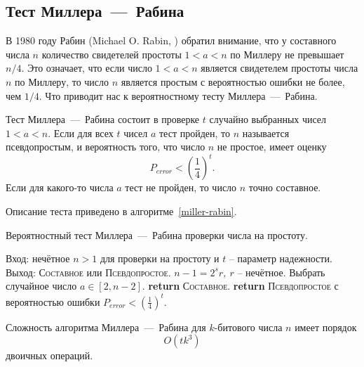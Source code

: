 \subsection{Тест Миллера~---~Рабина}\label{section-prime-check-miller-rabin}

В 1980 году Рабин (Michael O. Rabin, \cite{Rabin:1980}) обратил внимание, что у составного числа $n$ количество свидетелей простоты $1 < a < n$ по Миллеру не превышает $n/4$. Это означает, что если число $1 < a < n$ является свидетелем простоты числа $n$ по Миллеру, то число $n$ является простым с вероятностью ошибки не более, чем $1/4$. Что приводит нас к вероятностному тесту Миллера~---~Рабина.

Тест Миллера~---~Рабина состоит в проверке $t$ случайно выбранных чисел $1 < a < n$. Если для всех $t$ чисел $a$ тест пройден, то $n$ называется псевдопростым, и вероятность того, что число $n$ не простое, имеет оценку
    \[ P_{error} < \left( \frac{1}{4} \right)^t. \]
Если для какого-то числа $a$ тест не пройден, то число $n$ точно составное.

Описание теста приведено в алгоритме~\ref{miller-rabin}.

\begin{algorithm}[iht]
    \caption{Вероятностный тест Миллера~---~Рабина проверки числа на простоту.\label{miller-rabin}}
    \begin{algorithmic}
        \STATE Вход: нечётное $n>1$ для проверки на простоту и $t$ -- параметр надежности.
        \STATE Выход: \textsc{Составное} или \textsc{Псевдопростое}.
        \STATE $n - 1 = 2^s r, ~ r$ -- нечётное.
            \STATE Выбрать случайное число $a \in [2, n-2]$.
               \STATE \textbf{return} \textsc{Составное}.
           \ENDIF
        \ENDFOR
       \STATE \textbf{return} \textsc{Псевдопростое} с вероятностью ошибки $P_{error} < \left( \frac{1}{4} \right)^t$.
    \end{algorithmic}
\end{algorithm}

Сложность алгоритма Миллера~---~Рабина для $k$-битового числа $n$ имеет порядок
    \[ O(t k^3) \]
двоичных операций.

